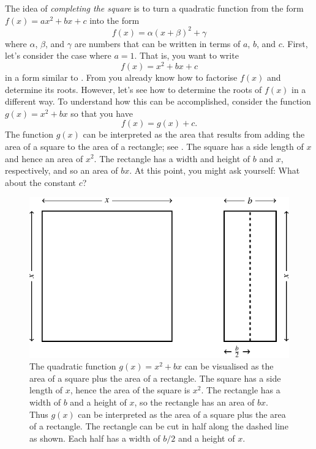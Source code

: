 \documentclass[a4paper,oneside,12pt]{article}
\begin{document}
The idea of \emph{completing the square} is to turn a quadratic
function from the form $f(x) = ax^2 + bx + c$ into the form
\begin{equation}
\label{eqn:quadroots:completing_square_general_form}
f(x)
=
\alpha(x + \beta)^2 + \gamma
\end{equation}
where $\alpha$, $\beta$, and $\gamma$ are numbers that can be written
in terms of $a$, $b$, and $c$.  First, let's consider the case where
$a = 1$.  That is, you want to write
\[
f(x)
=
x^2 + bx + c
\]
in a form similar to
.
From  you already know how
to factorise $f(x)$ and determine its roots.  However, let's see how
to determine the roots of $f(x)$ in a different way.  To understand
how this can be accomplished, consider the function $g(x) = x^2 + bx$
so that you have
\begin{equation}
\label{eqn:quadroots:completing_square_special_case}
f(x)
=
g(x) + c.
\end{equation}
The function $g(x)$ can be interpreted as the area that results from
adding the area of a square to the area of a rectangle; see
.
The square has a side length of $x$ and hence an area of $x^2$.  The
rectangle has a width and height of $b$ and $x$, respectively, and so
an area of $bx$.  At this point, you might ask yourself:  What about
the constant $c$?

\begin{figure}[!htbp]
\centering
\includegraphics[scale=1.1]{image/10/complete-square-a1-c0.pdf}
\caption{%
  The quadratic function $g(x) = x^2 + bx$ can be visualised as the
  area of a square plus the area of a rectangle.  The square has a
  side length of $x$, hence the area of the square is $x^2$.  The
  rectangle has a width of $b$ and a height of $x$, so the rectangle
  has an area of $bx$.  Thus $g(x)$ can be interpreted as the area of
  a square plus the area of a rectangle.  The rectangle can be cut in
  half along the dashed line as shown.  Each half has a width of $b/2$
  and a height of $x$.
}
\label{fig:quadroots:special_complete_square_square_plus_rectangle}
\end{figure}
\end{document}
